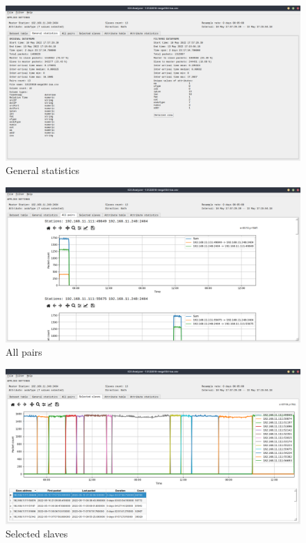 \begin{figure}[H]
	\centering
	\includegraphics[width=1\textwidth]{obrazky-figures/tabs/tab2.png}
	\caption{General statistics}
	\label{fig:tab2}
    \end{figure}
    
    
    \begin{figure}[H]
    	\centering
    	\includegraphics[width=1\textwidth]{obrazky-figures/tabs/tab3.png}
    	\caption{All pairs}
    	\label{fig:tab3}
    \end{figure}
    
    
    \begin{figure}[H]
    	\centering
    	\includegraphics[width=1\textwidth]{obrazky-figures/tabs/tab4.png}
    	\caption{Selected slaves}
    	\label{fig:tab4}
    \end{figure}
    
